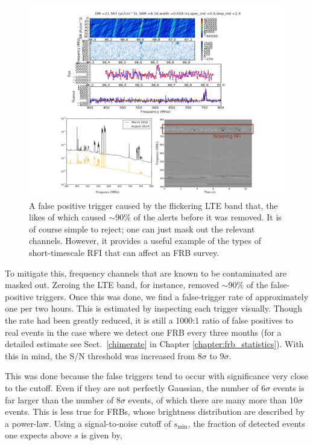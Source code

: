 \begin{figure}[!h]
\begin{center}
\includegraphics[trim={0in 0in 0in 0in}, scale=0.5]
{./figures/beamforming/lte_trigger.png}
\vspace{0.0cm}
\caption[abc]{A false positive trigger caused by the flickering 
     LTE band that, the likes of which 
     caused $\sim$90$\%$ of the alerts before it was removed.
     It is of course simple to reject; one can just mask 
     out the relevant channels.
     However, it provides a useful example of the types of 
     short-timescale RFI that can affect an FRB survey.}
\label{fig-lte_trigger}
\end{center}
\end{figure}


To mitigate this, frequency channels that are known 
to be contaminated are masked out. Zeroing the LTE band,
for instance, removed $\sim$90$\%$ of the false-positive triggers. 
Once this was done, we find a false-trigger rate of 
approximately one per two hours. This is estimated 
by inspecting each trigger visually. Though the rate 
had been greatly reduced, it is still a 1000:1 ratio of 
false positives to real events in the case where we detect 
one FRB every three months (for a detailed estimate see Sect.~\ref{chimerate}
in Chapter \ref{chapter:frb_statistics}). With this in mind, 
the S/N threshold was increased from 8$\sigma$ to 9$\sigma$. 

This was done because the false triggers tend to occur 
with significance very close to the cutoff. Even if they are 
not perfectly Gaussian, the number of 6$\sigma$ events is 
far larger than the number of 8$\sigma$ events, of which 
there are many more than 10$\sigma$ events. 
This is less true for FRBs, whose brightness distribution 
are described by a power-law. Using a signal-to-noise 
cutoff of $s_\mathrm{min}$, the fraction 
of detected events one expects above $s$ is given by,

